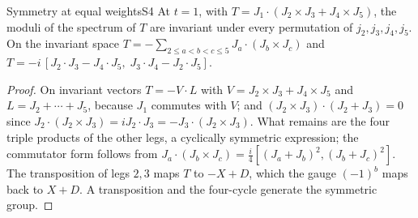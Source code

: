 \begin{proposition}{Symmetry at equal weights}{S4}
At $t=1$, with $T=J_1\cdot(J_2\times J_3+J_4\times J_5)$, the moduli of the
spectrum of $T$ are invariant under every permutation of $j_2,j_3,j_4,j_5$. On the
invariant space $T=-\sum_{2\le a<b<c\le5}J_a\cdot(J_b\times J_c)$ and
$T=-i\,[J_2\cdot J_3-J_4\cdot J_5,\;J_3\cdot J_4-J_2\cdot J_5]$.
\end{proposition}

\begin{proof}
On invariant vectors $T=-V\cdot L$ with $V=J_2\times J_3+J_4\times J_5$ and
$L=J_2+\cdots+J_5$, because $J_1$ commutes with $V$; and $(J_2\times J_3)\cdot(J_2+J_3)=0$
since $J_2\cdot(J_2\times J_3)=iJ_2\cdot J_3=-J_3\cdot(J_2\times J_3)$. What remains are
the four triple products of the other legs, a cyclically symmetric expression; the
commutator form follows from $J_a\cdot(J_b\times J_c)=\frac i4[(J_a+J_b)^2,(J_b+J_c)^2]$.
The transposition of legs $2,3$ maps $T$ to $-X+D$, which the gauge $(-1)^b$ maps back
to $X+D$. A transposition and the four-cycle generate the symmetric group.
\end{proof}
